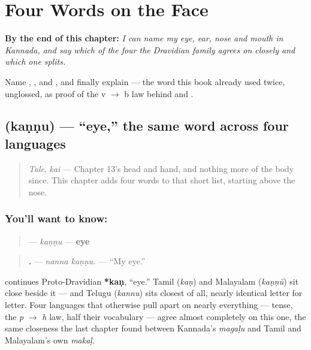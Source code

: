 
\chapter{Four Words on the Face}
\label{ch:ka-face-words}

\begin{chapteropening}
\textbf{By the end of this chapter:} \emph{I can name my eye, ear, nose and mouth in Kannada, and say which of the four the Dravidian family agrees on closely and which one splits.}

Name , ,  and , and finally explain  — the word this book already used twice, unglossed, as proof of the v $\to$ b law behind  and .
\end{chapteropening}

\section[\texorpdfstring{\kn{ಕಣ್ಣು} (kaṇṇu)}{ಕಣ್ಣು (kaṇṇu)}]{ (kaṇṇu) — \textquotedblleft{}eye,\textquotedblright{} the same word across four languages}

\label{lesson:KA-C37-kannu}



\begin{quote}
\emph{Tale}, \emph{kai} — Chapter 13's head and hand, and nothing more of the body since. This chapter adds four words to that short list, starting above the nose.
\end{quote}

\subsection*{You'll want to know: }
\begin{quote}
\textbf{} — \emph{kaṇṇu} — \textbf{eye}
\end{quote}

\begin{quote}
\textbf{ .} — \emph{nanna kaṇṇu.} — \textquotedblleft{}My eye.\textquotedblright{}
\end{quote}

\begin{cousinweb}
\textbf{} continues Proto-Dravidian \textbf{*kaṇ}, \textquotedblleft{}eye.\textquotedblright{} Tamil \textbf{} (\emph{kaṇ}) and Malayalam \textbf{} (\emph{kaṇṇŭ}) sit close beside it — and Telugu \textbf{} (\emph{kannu}) sits closest of all, nearly identical letter for letter. Four languages that otherwise pull apart on nearly everything — tense, the \emph{p} $\to$ \emph{h} law, half their vocabulary — agree almost completely on this one, the same closeness the last chapter found between Kannada's \emph{magaḷu} and Tamil and Malayalam's own \emph{makaḷ}.
\end{cousinweb}

